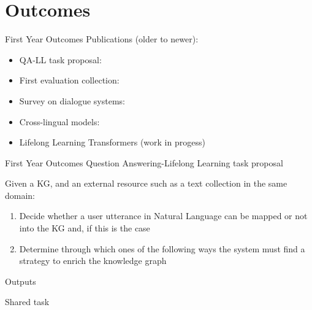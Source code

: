 \documentclass{beamer}
\begin{document}
\section{Outcomes}
\begin{frame}{First Year Outcomes}
  \alert{\Large Publications (older to newer):}
  \begin{itemize}
    \item QA-LL task proposal: \cite{penas2019continuous}
    \item First evaluation collection: \cite{veron2020cooking}
    \item Survey on dialogue systems: \cite{deriu2019survey}
    \item Cross-lingual models: \cite{echegoyen2020crosslingual}
    \item Lifelong Learning Transformers (work in progess)
  \end{itemize}
\end{frame}

\begin{frame}{First Year Outcomes}
  \alert{\Large Question Answering-Lifelong Learning task proposal} \par

  Given a KG, and an external resource such as a text collection in the same domain:
  \begin{enumerate}
    \item Decide whether a user utterance in Natural Language can be mapped or not into the KG and, if this is the case
    \item Determine through which ones of the following ways the system must find a strategy to enrich the knowledge graph
  \end{enumerate}
  \begin{block}{Outputs}
    \item Shared task
  \end{block}
\end{frame}

\end{document}
